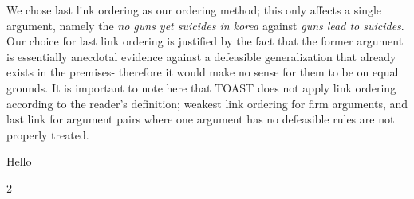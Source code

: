 \documentclass[]{article}
\begin{document}
We chose last link ordering as our ordering method; this only affects a single argument, namely the \textit{no guns yet suicides in korea} against \textit{guns lead to suicides}. Our choice for last link ordering is justified by the fact that the former argument is essentially anecdotal evidence against a defeasible generalization that already exists in the premises- therefore it would make no sense for them to be on equal grounds. It is important to note here that TOAST does not apply link ordering according to the reader's definition; weakest link ordering for firm arguments, and last link for argument pairs where one argument has no defeasible rules are not properly treated. 

Hello

2\cite{ASPIC}



\end{document}
